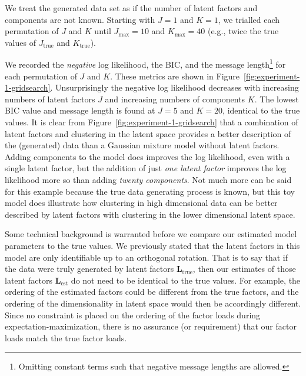 \documentclass[twocolumn]{aastex62}
\newcommand{\factorloads}{\textbf{L}}
\newcommand{\NumLatentFactors}{J}
\newcommand{\NumComponents}{K}
\begin{document}
We treat the generated data set as if the number of latent factors
and components are not known. Starting with $\NumLatentFactors = 1$
and $\NumComponents = 1$, we trialled each permutation of $\NumLatentFactors$ and $\NumComponents$
until $\NumLatentFactors_\textrm{max} = 10$
and   $\NumComponents_\textrm{max} = 40$ (e.g., twice the true values of $\NumLatentFactors_\textrm{true}$ and $\NumComponents_\textrm{true}$).


We recorded the \emph{negative} log likelihood, the BIC, and the message length\footnote{Omitting constant terms such that negative message lengths are allowed.}  for each permutation of $\NumLatentFactors$ and $\NumComponents$.
These metrics are shown in Figure~\ref{fig:experiment-1-gridsearch}.
Unsurprisingly the negative log likelihood decreases with increasing numbers of latent
factors $\NumLatentFactors$ and increasing numbers of components $\NumComponents$.
The lowest BIC value and message length is found at $\NumLatentFactors = 5$
and $\NumComponents = 20$, identical to the true values.
It is clear from Figure~\ref{fig:experiment-1-gridsearch} that a combination of latent factors
and clustering in the latent space provides a better description of the (generated) data than a Gaussian mixture model without latent factors.
Adding components to the model does improves the log likelihood, even with a single latent factor,
but the addition of just \emph{one latent factor} improves the log likelihood more so than adding
\emph{twenty components}. Not much more can be said for this example because the true data generating process 
is known, but this toy model does illustrate how 
clustering in high dimensional data can be better described by latent factors with 
clustering in the lower dimensional latent space.





Some technical background is warranted before we compare our estimated model
parameters to the true values. We previously stated that the latent factors in this model are only
identifiable up to an orthogonal rotation. That is to say that
if the data were truly generated by latent factors $\factorloads_\textrm{true}$,
then our estimates of those latent factors $\factorloads_\textrm{est}$ do not need
to be identical to the true values. For example, the ordering of the estimated factors
could be different from the true factors, and the ordering of the dimensionality
in latent space would then be accordingly different. Since no constraint is
placed on the ordering of the factor loads during expectation-maximization,
there is no assurance (or requirement) that our factor loads match the true factor loads.
\end{document}
